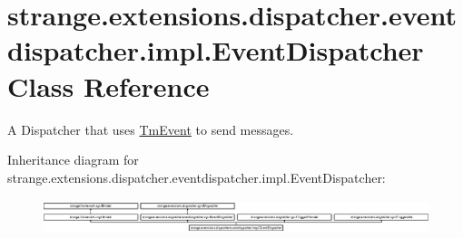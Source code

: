 \hypertarget{classstrange_1_1extensions_1_1dispatcher_1_1eventdispatcher_1_1impl_1_1_event_dispatcher}{\section{strange.\-extensions.\-dispatcher.\-eventdispatcher.\-impl.\-Event\-Dispatcher Class Reference}
\label{classstrange_1_1extensions_1_1dispatcher_1_1eventdispatcher_1_1impl_1_1_event_dispatcher}
}


A Dispatcher that uses \hyperlink{classstrange_1_1extensions_1_1dispatcher_1_1eventdispatcher_1_1impl_1_1_tm_event}{Tm\-Event} to send messages.  


Inheritance diagram for strange.\-extensions.\-dispatcher.\-eventdispatcher.\-impl.\-Event\-Dispatcher\-:\begin{figure}[H]
\begin{center}
\leavevmode
\includegraphics[height=1.037037cm]{classstrange_1_1extensions_1_1dispatcher_1_1eventdispatcher_1_1impl_1_1_event_dispatcher}
\end{center}
\end{figure}
